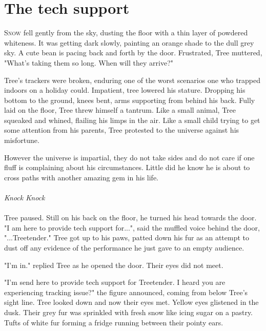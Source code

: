 

\chapter{The tech support}

\lettrine{S}{now} fell gently from the sky, dusting the floor with a thin layer of powdered whiteness. It was getting dark slowly, painting an orange shade to the dull grey sky. A cute bean is pacing back and forth by the door. Frustrated, Tree muttered, "What's taking them so long. When will they arrive?"

Tree's trackers were broken, enduring one of the worst scenarios one who trapped indoors on a holiday could. Impatient, tree lowered his stature. Dropping his bottom to the ground, knees bent, arms \mbox{supporting} from behind his back. Fully laid on the floor, Tree threw himself a tantrum. Like a small animal, Tree squeaked and whined, \mbox{flailing} his limps in the air. Like a small child trying to get some attention from his parents, Tree protested to the universe against his misfortune.

However the universe is impartial, they do not take sides and do not care if one fluff is complaining about his circumstances. Little did he know he is about to cross paths with another amazing gem in his life.
\\ \\
\emph{Knock Knock}
\\ \\
Tree paused. Still on his back on the floor, he turned his head \mbox{towards} the door. "I am here to provide tech support for...", said the muffled voice behind the door, "...Treetender." Tree got up to his paws, patted down his fur as an attempt to dust off any evidence of the performance he just gave to an empty audience.

"I'm in." replied Tree as he opened the door. Their eyes did not meet.

"I'm send here to provide tech support for Treetender. I heard you are experiencing tracking issue?" the figure announced, coming from below Tree's sight line. Tree looked down and now their eyes met. Yellow eyes glistened in the dusk. Their grey fur was sprinkled with fresh snow like icing sugar on a pastry. Tufts of white fur forming a fridge running between their pointy ears.

